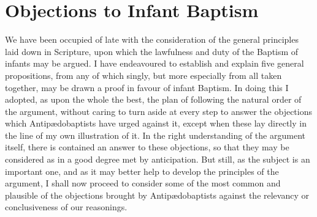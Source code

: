 \documentclass[
  english,
]{book}
\begin{document}
\hypertarget{objections-to-infant-baptism}{%
\section{Objections to Infant Baptism}\label{objections-to-infant-baptism}}

We have been occupied of late with the consideration of the general principles laid down in Scripture, upon which the lawfulness and duty of the Baptism of infants may be argued. I have endeavoured to establish and explain five general propositions, from any of which singly, but more especially from all taken together, may be drawn a proof in favour of infant Baptism. In doing this I adopted, as upon the whole the best, the plan of following the natural order of the argument, without caring to turn aside at every step to answer the objections which Antipædobaptists have urged against it, except when these lay directly in the line of my own illustration of it. In the right understanding of the argument itself, there is contained an answer to these objections, so that they may be considered as in a good degree met by anticipation. But still, as the subject is an important one, and as it may better help to develop the principles of the argument, I shall now proceed to consider some of the most common and plausible of the objections brought by Antipædobaptists against the relevancy or conclusiveness of our reasonings.
\end{document}
